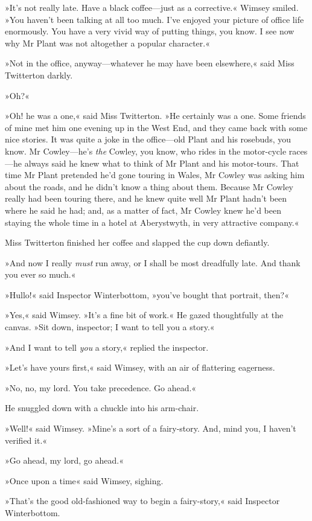 »It's not really late. Have a black coffee—just as a corrective.« Wimsey smiled. »You haven't been talking at all too much. I've enjoyed your picture of office life enormously. You have a very vivid way of putting things, you know. I see now why Mr Plant was not altogether a popular character.«

»Not in the office, anyway—whatever he may have been elsewhere,« said Miss Twitterton darkly.

»Oh?«

»Oh! he was a one,« said Miss Twitterton. »He certainly was a one. Some friends of mine met him one evening up in the West End, and they came back with some nice stories. It was quite a joke in the office—old Plant and his rosebuds, you know. Mr Cowley—he's \textit{the} Cowley, you know, who rides in the motor-cycle races—he always said he knew what to think of Mr Plant and his motor-tours. That time Mr Plant pretended he'd gone touring in Wales, Mr Cowley was asking him about the roads, and he didn't know a thing about them. Because Mr Cowley really had been touring there, and he knew quite well Mr Plant hadn't been where he said he had; and, as a matter of fact, Mr Cowley knew he'd been staying the whole time in a hotel at Aberystwyth, in very attractive company.«

Miss Twitterton finished her coffee and slapped the cup down defiantly.

»And now I really \textit{must} run away, or I shall be most dreadfully late. And thank you ever so much.«

»Hullo!« said Inspector Winterbottom, »you've bought that portrait, then?«

»Yes,« said Wimsey. »It's a fine bit of work.« He gazed thoughtfully at the canvas. »Sit down, inspector; I want to tell you a story.«

»And I want to tell \textit{you} a story,« replied the inspector.

»Let's have yours first,« said Wimsey, with an air of flattering eagerness.

»No, no, my lord. You take precedence. Go ahead.«

He snuggled down with a chuckle into his arm-chair.

»Well!« said Wimsey. »Mine's a sort of a fairy-story. And, mind you, I haven't verified it.«

»Go ahead, my lord, go ahead.«

»Once upon a time\longdash« said Wimsey, sighing.

»That's the good old-fashioned way to begin a fairy-story,« said Inspector Winterbottom.

